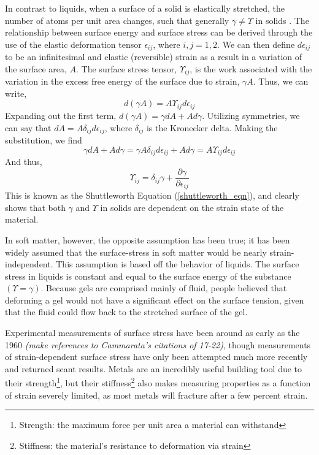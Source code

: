 In contrast to liquids, when a surface of a solid is elastically stretched, the number of atoms per unit area changes, such that generally $ \gamma \neq \Upsilon$ in solids \cite{cammarata1994surface}. The relationship between surface energy and surface stress can be derived through the use of the elastic deformation tensor $\epsilon_{ij}$, where $i,j=1,2$. We can then define $d\epsilon_{ij}$ to be an infinitesimal and elastic (reversible) strain as a result in a variation of the surface area, $A$. The surface stress tensor, $\Upsilon_{ij}$, is the work associated with the variation in the excess free energy of the surface due to strain, $\gamma A$. Thus, we can write, \[d(\gamma A) = A \Upsilon_{ij} d\epsilon_{ij}\] Expanding out the first term, $d(\gamma A) = \gamma dA + A d\gamma$. Utilizing symmetries, we can say that $dA = A \delta_{ij} d\epsilon_{ij}$, where $\delta_{ij}$ is the Kronecker delta. Making the substitution, we find \[\gamma dA + A d\gamma = \gamma A \delta_{ij} d\epsilon_{ij} + A d\gamma = A \Upsilon_{ij} d\epsilon_{ij}\] And thus,
\begin{equation}
	\label{shuttleworth_eqn}
	\Upsilon_{ij} = \delta_{ij}\gamma + \frac{\partial \gamma}{\partial \epsilon_{ij}} 
\end{equation}
This is known as the Shuttleworth Equation (\ref{shuttleworth_eqn}), and clearly shows that both $\gamma$ and $\Upsilon$ in solids are dependent on the strain state of the material.

In soft matter, however, the opposite assumption has been true; it has been widely assumed that the surface-stress in soft matter would be nearly strain-independent. This assumption is based off the behavior of liquids. The surface stress in liquids is constant and equal to the surface energy of the substance $(\Upsilon = \gamma)$. Because gels are comprised mainly of fluid, people believed that deforming a gel would not have a significant effect on the surface tension, given that the fluid could flow back to the stretched surface of the gel. 

Experimental measurements of surface stress have been around as early as the 1960 \emph{(make references to Cammarata's citations of 17-22)}, though measurements of strain-dependent surface stress have only been attempted much more recently and returned scant results. Metals are an incredibly useful building tool due to their strength\footnote{Strength: the maximum force per unit area a material can withstand}, but their stiffness\footnote{Stiffness: the material's resistance to deformation via strain} also makes measuring properties as a function of strain severely limited, as most metals will fracture after a few percent strain.


